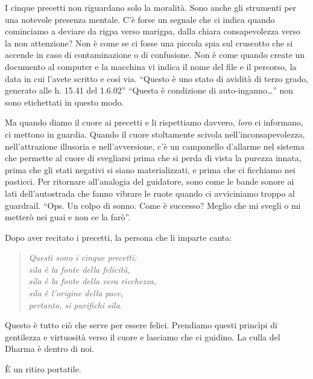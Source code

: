 \vspace*{-0.8em}
I cinque precetti non riguardano solo la moralità. Sono anche gli strumenti per una notevole presenza mentale. C'è forse un segnale che ci indica quando cominciamo a deviare da rigpa verso marigpa, dalla chiara consapevolezza verso la non attenzione? Non è come se ci fosse una piccola spia sul cruscotto che si accende in caso di contaminazione o di confusione. Non è come quando create un documento al computer e la macchina vi indica il nome del file e il percorso, la data in cui l'avete scritto e così via. ``Questo è uno stato di avidità di terzo grado, generato alle h. 15.41 del 1.6.02'' ``Questa è condizione di auto-inganno\ldots{}'' non sono etichettati in questo modo.

Ma quando diamo il cuore ai precetti e li rispettiamo davvero, \textit{loro} ci informano, ci mettono in guardia. Quando il cuore stoltamente scivola nell'inconsapevolezza, nell'attrazione illusoria e nell'avversione, c'è un campanello d'allarme nel sistema che permette al cuore di svegliarsi prima che si perda di vista la purezza innata, prima che gli stati negativi si siano materializzati, e prima che ci ficchiamo nei pasticci. Per ritornare all'analogia del guidatore, sono come le bande sonore ai lati dell'autostrada che fanno vibrare le ruote quando ci avviciniamo troppo al guardrail. ``Ops. Un colpo di sonno. Come è successo? Meglio che mi svegli o mi metterò nei guai e non ce la farò''.

Dopo aver recitato i precetti, la persona che li imparte canta: 

\vspace*{-0.8em}
\begin{quote}
\itshape
Questi sono i cinque precetti: \\
sīla è la fonte della felicità, \\
sīla è la fonte della vera ricchezza, \\
sīla è l'origine della pace, \\
pertanto, si purifichi sīla.
\end{quote}

\vspace*{-0.8em}
Questo è tutto ciò che serve per essere felici. Prendiamo questi princìpi di gentilezza e virtuosità verso il cuore e lasciamo che ci guidino. La culla del Dharma è dentro di noi.

È un ritiro portatile.
